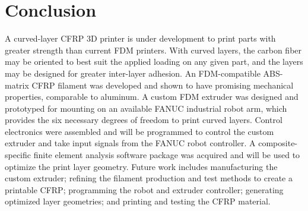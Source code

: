\section{Conclusion}

A curved-layer CFRP 3D printer is under development to print parts with greater strength than current FDM printers. With curved layers, the carbon fiber may be oriented to best suit the applied loading on any given part, and the layers may be designed for greater inter-layer adhesion. An FDM-compatible ABS-matrix CFRP filament was developed and shown to have promising mechanical properties, comparable to aluminum. A custom FDM extruder was designed and prototyped for mounting on an available FANUC industrial robot arm, which provides the six necessary degrees of freedom to print curved layers. Control electronics were assembled and will be programmed to control the custom extruder and take input signals from the FANUC robot controller. A composite-specific finite element analysis software package was acquired and will be used to optimize the print layer geometry. Future work includes manufacturing the custom extruder; refining the filament production and test methods to create a printable CFRP; programming the robot and extruder controller; generating optimized layer geometries; and printing and testing the CFRP material. 

